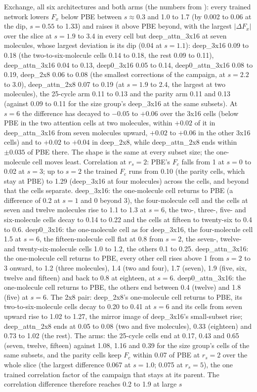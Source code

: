 \documentclass[10pt,a4paper]{article}
\begin{document}
Exchange, all six architectures and both arms (the numbers from ): every trained network lowers $F_x$ below PBE between $s \approx 0.3$ and 1.0 to 1.7 (by 0.002 to 0.06 at the dip, $s = 0.55$ to 1.33) and raises it above PBE beyond, with the largest $|\Delta F_x|$ over the slice at $s = 1.9$ to 3.4 in every cell but deep\_attn\_3x16 at seven molecules, whose largest deviation is its dip (0.04 at $s = 1.1$): deep\_3x16 0.09 to 0.18 (the two-to-six-molecule cells 0.14 to 0.18, the rest 0.09 to 0.11), deep\_attn\_3x16 0.04 to 0.13, deep0\_3x16 0.05 to 0.14, deep0\_attn\_3x16 0.08 to 0.19, deep\_2x8 0.06 to 0.08 (the smallest corrections of the campaign, at $s = 2.2$ to 3.0), deep\_attn\_2x8 0.07 to 0.19 (at $s = 1.9$ to 2.4, the largest at two molecules), the 25-cycle arm 0.11 to 0.13 and the parity arm 0.11 and 0.13 (against 0.09 to 0.11 for the size group's deep\_3x16 at the same subsets). At $s = 6$ the difference has decayed to $-0.05$ to $+0.06$ over the 3x16 cells (below PBE in the two attention cells at two molecules, within $+0.02$ of it in deep\_attn\_3x16 from seven molecules upward, $+0.02$ to $+0.06$ in the other 3x16 cells) and to $+0.02$ to $+0.04$ in deep\_2x8, while deep\_attn\_2x8 ends within $\pm 0.035$ of PBE there. The shape is the same at every subset size; the one-molecule cell moves least. Correlation at $r_s = 2$: PBE's $F_c$ falls from 1 at $s = 0$ to 0.02 at $s = 3$; up to $s = 2$ the trained $F_c$ runs from 0.10 (the parity cells, which stay at PBE) to 1.29 (deep\_3x16 at four molecules) across the cells, and beyond that the cells separate. deep\_3x16: the one-molecule cell returns to PBE (a difference of 0.2 at $s = 1$ and 0 beyond 3), the four-molecule cell and the cells at seven and twelve molecules rise to 1.1 to 1.3 at $s = 6$, the two-, three-, five- and six-molecule cells decay to 0.14 to 0.22 and the cells at fifteen to twenty-six to 0.4 to 0.6. deep0\_3x16: the one-molecule cell as for deep\_3x16, the four-molecule cell 1.5 at $s = 6$, the fifteen-molecule cell flat at 0.8 from $s = 2$, the seven-, twelve- and twenty-six-molecule cells 1.0 to 1.2, the others 0.1 to 0.25. deep\_attn\_3x16: the one-molecule cell returns to PBE, every other cell rises above 1 from $s = 2$ to 3 onward, to 1.2 (three molecules), 1.4 (two and four), 1.7 (seven), 1.9 (five, six, twelve and fifteen) and back to 0.8 at eighteen, at $s = 6$. deep0\_attn\_3x16: the one-molecule cell returns to PBE, the others end between 0.4 (twelve) and 1.8 (five) at $s = 6$. The 2x8 pair: deep\_2x8's one-molecule cell returns to PBE, its two-to-six-molecule cells decay to 0.20 to 0.41 at $s = 6$ and its cells from seven upward rise to 1.02 to 1.27, the mirror image of deep\_3x16's small-subset rise; deep\_attn\_2x8 ends at 0.05 to 0.08 (two and five molecules), 0.33 (eighteen) and 0.73 to 1.02 (the rest). The arms: the 25-cycle cells end at 0.17, 0.43 and 0.65 (seven, twelve, fifteen) against 1.08, 1.16 and 0.39 for the size group's cells of the same subsets, and the parity cells keep $F_c$ within 0.07 of PBE at $r_s = 2$ over the whole slice (the largest difference 0.067 at $s = 1.0$; 0.075 at $r_s = 5$), the one trained correlation factor of the campaign that stays at its parent. The correlation difference therefore reaches 0.2 to 1.9 at large $s$ 
\end{document}
